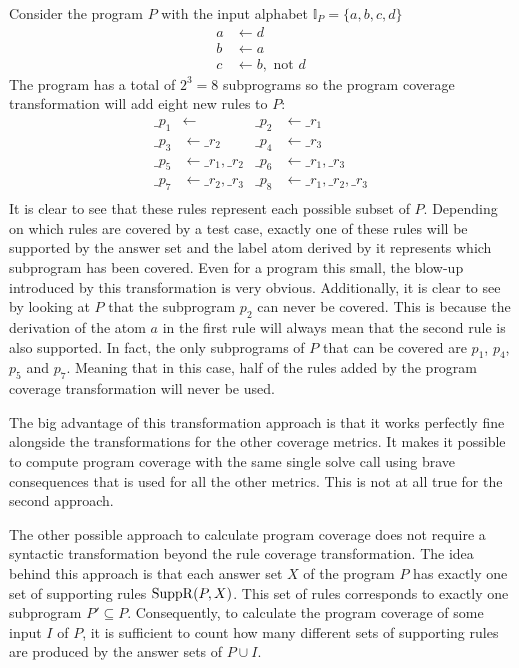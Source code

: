 \begin{example}
\label{ex:program transformation}
    Consider the program $P$ with the input alphabet \(\mathbb{I}_P = \{a, b, c, d\}\)
    \begin{align*}
        a &\leftarrow d \\
        b &\leftarrow a \\
        c &\leftarrow b, \text{ not } d
    \end{align*}
    The program has a total of \(2^3 = 8\) subprograms so the program coverage transformation will add eight new rules to $P$:
    \begin{align*}
        \_p_1 &\leftarrow              &   \_p_2 &\leftarrow \_r_1 \\
        \_p_3 &\leftarrow \_r_2        &   \_p_4 &\leftarrow \_r_3 \\
        \_p_5 &\leftarrow \_r_1, \_r_2 &   \_p_6 &\leftarrow \_r_1, \_r_3 \\
        \_p_7 &\leftarrow \_r_2, \_r_3 &   \_p_8 &\leftarrow \_r_1, \_r_2, \_r_3 \\
    \end{align*}
    It is clear to see that these rules represent each possible subset of $P$. Depending on which rules are covered by a test case, exactly one of these rules will be supported by the answer set and the label atom derived by it represents which subprogram has been covered. Even for a program this small, the blow-up introduced by this transformation is very obvious. Additionally, it is clear to see by looking at $P$ that the subprogram $p_2$ can never be covered. This is because the derivation of the atom $a$ in the first rule will always mean that the second rule is also supported. In fact, the only subprograms of $P$ that can be covered are $p_1$, $p_4$, $p_5$ and $p_7$. Meaning that in this case, half of the rules added by the program coverage transformation will never be used.
\end{example}

The big advantage of this transformation approach is that it works perfectly fine alongside the transformations for the other coverage metrics. It makes it possible to compute program coverage with the same single solve call using brave consequences that is used for all the other metrics. This is not at all true for the second approach.

The other possible approach to calculate program coverage does not require a syntactic transformation beyond the rule coverage transformation. The idea behind this approach is that each answer set $X$ of the program $P$ has exactly one set of supporting rules \(\operatorname{SuppR}(P, X)\). This set of rules corresponds to exactly one subprogram \(P' \subseteq P\). Consequently, to calculate the program coverage of some input $I$ of $P$, it is sufficient to count how many different sets of supporting rules are produced by the answer sets of $P \cup I$.

